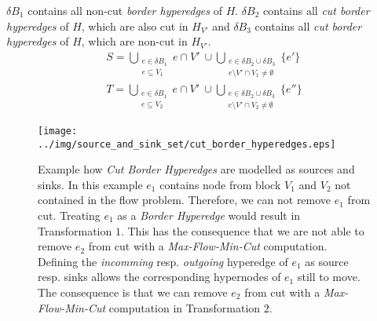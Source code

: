 $\delta B_1$ contains all non-cut \emph{border hyperedges} of $H$. $\delta B_2$ contains 
all \emph{cut border hyperedges} of $H$, which are also cut in $H_{V'}$ and $\delta B_3$ contains
all \emph{cut border hyperedges} of $H$, which are non-cut in $H_{V'}$.
\begin{align}
S = \bigcup\limits_{\substack{e \in \delta B_1 \\ e \subseteq V_1}} e\cap V'\ \cup \bigcup\limits_{\substack{e \in \delta B_2 \cup \delta B_3 \\ e \setminus V' \cap V_1 \neq \emptyset}} \{e'\} \label{S_final_border_hyperedges}\\
T = \bigcup\limits_{\substack{e \in \delta B_1 \\ e \subseteq V_2}} e\cap V'\ \cup \bigcup\limits_{\substack{e \in \delta B_2 \cup \delta B_3 \\ e \setminus V' \cap V_2 \neq \emptyset}} \{e''\} \label{T_final_border_hyperedges}
\end{align}

\begin{figure}
\centering
\texttt{[image: ../img/source\_and\_sink\_set/cut\_border\_hyperedges.eps]}
\caption{Example how \emph{Cut Border Hyperedges} are modelled as sources and sinks. In this
         example $e_1$ contains node from block $V_1$ and $V_2$ not contained in the flow problem. Therefore,
         we can not remove $e_1$ from cut. Treating $e_1$ as a \emph{Border Hyperedge} would result
         in Transformation $1$. This has the consequence that we are not able to remove $e_2$
         from cut with a \emph{Max-Flow-Min-Cut} computation. Defining the \emph{incomming} resp.
         \emph{outgoing} hyperedge of $e_1$ as source resp. sinks allows the corresponding hypernodes
         of $e_1$ still to move. The consequence is that we can remove $e_2$ from cut with a
         \emph{Max-Flow-Min-Cut} computation in Transformation $2$.}
\label{img:cut_border_hyperedges}
\end{figure}

